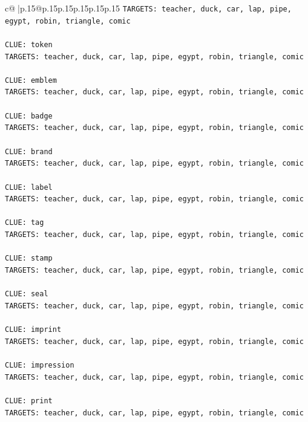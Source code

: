 \documentclass{article}
\begin{document}
{\begin{supertabular}{c@{$\;$}|p{.15\linewidth}@{}p{.15\linewidth}p{.15\linewidth}p{.15\linewidth}p{.15\linewidth}p{.15\linewidth}}
{{{\texttt{TARGETS: teacher, duck, car, lap, pipe, egypt, robin, triangle, comic} \\
\\ 
\texttt{CLUE: token} \\
\texttt{TARGETS: teacher, duck, car, lap, pipe, egypt, robin, triangle, comic} \\
\\ 
\texttt{CLUE: emblem} \\
\texttt{TARGETS: teacher, duck, car, lap, pipe, egypt, robin, triangle, comic} \\
\\ 
\texttt{CLUE: badge} \\
\texttt{TARGETS: teacher, duck, car, lap, pipe, egypt, robin, triangle, comic} \\
\\ 
\texttt{CLUE: brand} \\
\texttt{TARGETS: teacher, duck, car, lap, pipe, egypt, robin, triangle, comic} \\
\\ 
\texttt{CLUE: label} \\
\texttt{TARGETS: teacher, duck, car, lap, pipe, egypt, robin, triangle, comic} \\
\\ 
\texttt{CLUE: tag} \\
\texttt{TARGETS: teacher, duck, car, lap, pipe, egypt, robin, triangle, comic} \\
\\ 
\texttt{CLUE: stamp} \\
\texttt{TARGETS: teacher, duck, car, lap, pipe, egypt, robin, triangle, comic} \\
\\ 
\texttt{CLUE: seal} \\
\texttt{TARGETS: teacher, duck, car, lap, pipe, egypt, robin, triangle, comic} \\
\\ 
\texttt{CLUE: imprint} \\
\texttt{TARGETS: teacher, duck, car, lap, pipe, egypt, robin, triangle, comic} \\
\\ 
\texttt{CLUE: impression} \\
\texttt{TARGETS: teacher, duck, car, lap, pipe, egypt, robin, triangle, comic} \\
\\ 
\texttt{CLUE: print} \\
\texttt{TARGETS: teacher, duck, car, lap, pipe, egypt, robin, triangle, comic} \\
}}}
\end{supertabular}}
\end{document}
